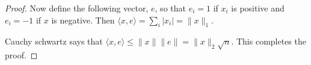 \documentclass[letter]{article}
\newenvironment{menumerate}{%
  \edef\backupindent{\the\parindent}%
  \enumerate%
  \setlength{\parindent}{\backupindent}%
}{\endenumerate}
\begin{document}
\begin{menumerate}
\begin{menumerate}
\begin{proof}
            Now define the following vector, $e$, so that $e_i = 1$ if
            $x_i$ is positive and $e_i = -1$ if $x$ is negative.
            Then $\langle x, e \rangle = \sum_i |x_i| = \|x\|_1.$

            Cauchy schwartz says that $\langle x, e \rangle \leq \|x\|\|e\| = \|x\|_2\sqrt{n}.$
            This completes the proof.
       \end{proof}
  \end{menumerate}
\end{menumerate}
\end{document}
